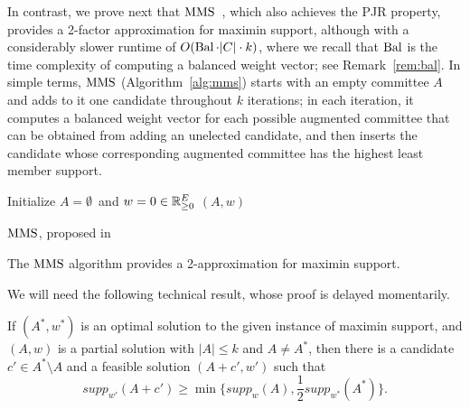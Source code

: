 In contrast, we prove next that $\operatorname{MMS}$~\cite{sanchez2016maximin}, which also achieves the PJR property, provides a 2-factor approximation for maximin support, although with a considerably slower runtime of $O(\operatorname{Bal} \cdot |C|\cdot k)$, where we recall that $\operatorname{Bal}$ is the time complexity of computing a balanced weight vector; see Remark~\ref{rem:bal}. In simple terms, $\operatorname{MMS}$  (Algorithm~\ref{alg:mms}) starts with an empty committee $A$ and adds to it one candidate throughout $k$ iterations; in each iteration, it computes a balanced weight vector for each possible augmented committee that can be obtained from adding an unelected candidate, and then inserts the candidate whose corresponding augmented committee has the highest least member support.


\begin{algorithm}[htb]\label{alg:mms}
\SetAlgoLined
{}
Initialize $A=\emptyset$\ and $w=0\in \mathbb{R}_{\geq 0}^E$\;
\Return $(A,w)$\;
\caption{$\operatorname{MMS}$, proposed in~\cite{sanchez2016maximin}}
\end{algorithm}

\begin{theorem}\label{thm:mms}
The $\operatorname{MMS}$ algorithm provides a 2-approximation for maximin support.
\end{theorem}

We will need the following technical result, whose proof is delayed momentarily. 

\begin{lemma}\label{lem:2sols}
If $(A^*, w^*)$ is an optimal solution to the given instance of maximin support, and $(A,w)$ is a partial solution with $|A|\leq k$ and $A\neq A^*$, then there is a candidate $c'\in A^*\setminus A$ and a feasible solution $(A+c', w')$ such that 
$$supp_{w'}(A+c')\geq \min\Big\{supp_w(A), \frac{1}{2} supp_{w^*}(A^*)\Big\}.$$
\end{lemma}


